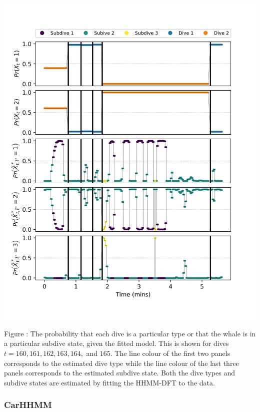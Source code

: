 \documentclass{article}
\begin{document}
        \begin{center}
        \includegraphics[width=6in]{../Plots/HHMM_decoded_states.png}
        \end{center}
        
        \noindent Figure : The probability that each dive is a particular type or that the whale is in a particular subdive state, given the fitted model. This is shown for dives $t = 160,161,162,163,164,$ and $165$. The line colour of the first two panels corresponds to the estimated dive type while the line colour of the last three panels corresponds to the estimated subdive state. Both the dive types and subdive states are estimated by fitting the HHMM-DFT to the data.
        \addtocounter{fignum}{1}
        
        \subsubsection{CarHHMM}
        
\end{document}
